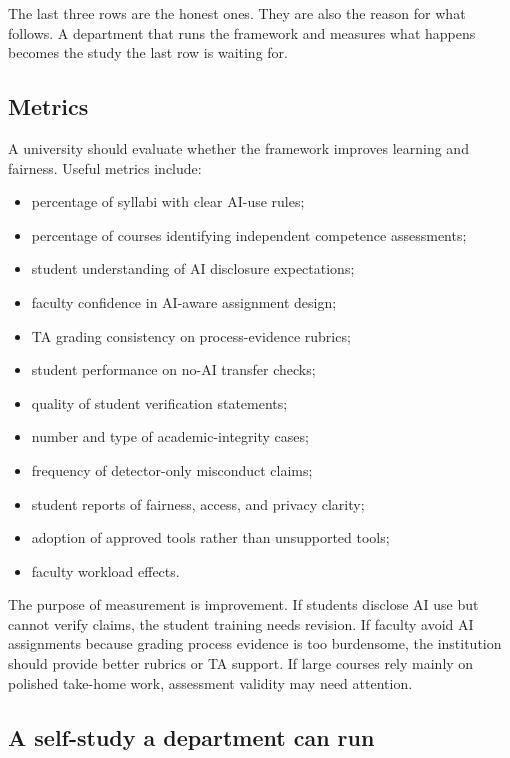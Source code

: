\documentclass{SIAMbook2023}
\begin{document}
The last three rows are the honest ones. They are also the reason for what follows. A department that
runs the framework and measures what happens becomes the study the last row is waiting for.

\subsection{Metrics}

A university should evaluate whether the framework improves learning and fairness. Useful metrics
include:

\begin{itemize}
  \item percentage of syllabi with clear AI-use rules;
  \item percentage of courses identifying independent competence assessments;
  \item student understanding of AI disclosure expectations;
  \item faculty confidence in AI-aware assignment design;
  \item TA grading consistency on process-evidence rubrics;
  \item student performance on no-AI transfer checks;
  \item quality of student verification statements;
  \item number and type of academic-integrity cases;
  \item frequency of detector-only misconduct claims;
  \item student reports of fairness, access, and privacy clarity;
  \item adoption of approved tools rather than unsupported tools;
  \item faculty workload effects.
\end{itemize}

The purpose of measurement is improvement. If students disclose AI use but cannot verify claims, the student training needs revision. If faculty avoid AI assignments because grading process evidence is too burdensome, the institution should provide better rubrics or TA support. If large courses rely mainly on polished take-home work, assessment validity may need attention.

\subsection{A self-study a department can run}
\label{u:subsec:self-study}%
\end{document}

